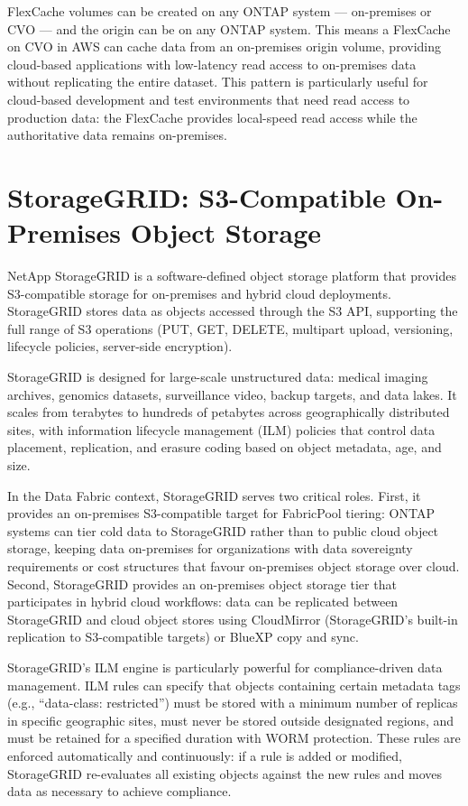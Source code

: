 FlexCache volumes can be created on any ONTAP system --- on-premises or CVO
--- and the origin can be on any ONTAP system. This means a FlexCache on CVO
in AWS can cache data from an on-premises origin volume, providing
cloud-based applications with low-latency read access to on-premises data
without replicating the entire dataset. This pattern is particularly useful
for cloud-based development and test environments that need read access to
production data: the FlexCache provides local-speed read access while the
authoritative data remains on-premises.

\section{StorageGRID: S3-Compatible On-Premises Object Storage}

NetApp StorageGRID is a software-defined object storage platform that provides
S3-compatible storage for on-premises and hybrid cloud deployments.
StorageGRID stores data as objects accessed through the S3 API, supporting the
full range of S3 operations (PUT, GET, DELETE, multipart upload, versioning,
lifecycle policies, server-side encryption).

StorageGRID is designed for large-scale unstructured data: medical imaging
archives, genomics datasets, surveillance video, backup targets, and data
lakes. It scales from terabytes to hundreds of petabytes across geographically
distributed sites, with information lifecycle management (ILM) policies that
control data placement, replication, and erasure coding based on object
metadata, age, and size.

In the Data Fabric context, StorageGRID serves two critical roles. First, it
provides an on-premises S3-compatible target for FabricPool tiering: ONTAP
systems can tier cold data to StorageGRID rather than to public cloud object
storage, keeping data on-premises for organizations with data sovereignty
requirements or cost structures that favour on-premises object storage over
cloud. Second, StorageGRID provides an on-premises object storage tier that
participates in hybrid cloud workflows: data can be replicated between
StorageGRID and cloud object stores using CloudMirror (StorageGRID's built-in
replication to S3-compatible targets) or BlueXP copy and sync.

StorageGRID's ILM engine is particularly powerful for compliance-driven data
management. ILM rules can specify that objects containing certain metadata
tags (e.g., ``data-class: restricted'') must be stored with a minimum number
of replicas in specific geographic sites, must never be stored outside
designated regions, and must be retained for a specified duration with WORM
protection. These rules are enforced automatically and continuously: if a rule
is added or modified, StorageGRID re-evaluates all existing objects against
the new rules and moves data as necessary to achieve compliance.

